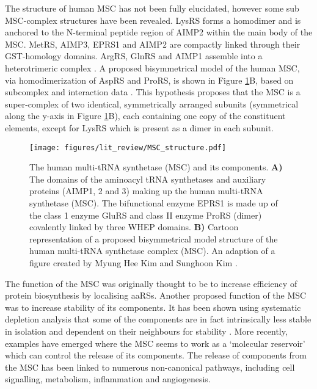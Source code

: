 The structure of human MSC has not been fully elucidated, however some sub MSC-complex structures have been revealed.
LysRS forms a homodimer and is anchored to the N-terminal peptide region of AIMP2 within the main body of the MSC.
MetRS, AIMP3, EPRS1 and AIMP2 are compactly linked through their GST-homology domains.
ArgRS, GlnRS and AIMP1 assemble into a heterotrimeric complex \cite{kim2019evolution, khan20203, kim2020structures}.
A proposed bisymmetrical model of the human MSC, via homodimerization of AspRS and ProRS, is shown in Figure \ref{fig:MSC}B, based on subcomplex and interaction data \cite{cho2015assembly, kaminska2009dissection, mirande2017aminoacyl}.
This hypothesis proposes that the MSC is a super-complex of two identical, symmetrically arranged subunits (symmetrical along the y-axis in Figure \ref{fig:MSC}B), each containing one copy of the constituent elements, except for LysRS which is present as a dimer in each subunit.

\begin{figure}[htb]
\centering
\texttt{[image: figures/lit\_review/MSC\_structure.pdf]}
\caption[Multi-tRNA synthetase structure]{The human multi-tRNA synthetase (MSC) and its components.
\textbf{A)} The domains of the aminoacyl tRNA synthetases and auxiliary proteins (AIMP1, 2 and 3) making up the human multi-tRNA synthetase (MSC).
The bifunctional enzyme EPRS1 is made up of the class 1 enzyme GluRS and class II enzyme ProRS (dimer) covalently linked by three WHEP domains.
\textbf{B)} Cartoon representation of a proposed bisymmetrical model structure of the human multi-tRNA synthetase complex (MSC).
An adaption of a figure created by Myung Hee Kim and Sunghoon Kim \cite{kim2020structures}.
}
\label{fig:MSC}\end{figure}

The function of the MSC was originally thought to be to increase efficiency of protein biosynthesis by localising aaRSs.
Another proposed function of the MSC was to increase stability of its components.
It has been shown using systematic depletion analysis that some of the components are in fact intrinsically less stable in isolation and dependent on their neighbours for stability \cite{han2006hierarchical}.
More recently, examples have emerged where the MSC seems to work as a `molecular reservoir' which can control the release of its components.
The release of components from the MSC has been linked to numerous non-canonical pathways, including cell signalling, metabolism, inflammation and angiogenesis.

